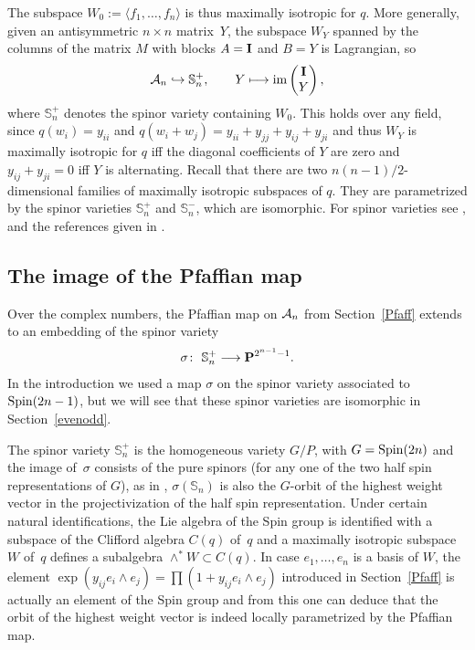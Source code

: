 \documentclass[pdftex]{sigma}
\newcommand{\PP}{{\bf P}}
\newcommand{\bS}{{\mathbb S}}
\newcommand{\cA}{{\cal A}}
\numberwithin{equation}{section}
\begin{document}
The subspace $W_0:=\langle f_1,\ldots,f_n\rangle$ is thus maximally isotropic for $q$. More generally, given an antisymmetric $n\times n$ matrix~$Y$, the subspace $W_Y$ spanned by the columns of the matrix $M$ with blocks $A={\bf I}$ and $B=Y$ is Lagrangian, so
\begin{gather*}
\cA_n \hookrightarrow \bS_n^+,\qquad Y \longmapsto \operatorname{im} \begin{pmatrix} {\bf I}\\Y\end{pmatrix},
\end{gather*}
where $\bS_n^+$ denotes the spinor variety containing $W_0$. This holds over any field, since $q(w_i)=y_{ii}$ and $q(w_i+w_j)=y_{ii}+y_{jj}+y_{ij}+y_{ji}$ and thus $W_Y$ is maximally isotropic for $q$ iff the diagonal coefficients of $Y$ are zero and $y_{ij}+y_{ji}=0$ iff $Y$ is alternating. Recall that there are two $n(n-1)/2$-dimensional families of maximally isotropic subspaces of $q$. They are parametrized by the spinor varieties $\bS_{n}^+$ and $\bS_{n}^-$, which are isomorphic. For spinor varieties see \cite{C}, \cite[Section~11.7]{P} and the references given in \cite[Section~6.0]{RS}.

\subsection{The image of the Pfaffian map}\label{impfaff}
Over the complex numbers, the Pfaffian map on $\cA_n$ from Section~\ref{Pfaff} extends to an embedding of the spinor variety
\begin{gather*}
\sigma\colon \ \bS_n^+ \longrightarrow \PP^{2^{n-1}-1}.
\end{gather*}
In the introduction we used a map $\sigma$ on the spinor variety associated to ${\rm Spin}(2n-1)$, but we will see that these spinor varieties are isomorphic in Section~\ref{evenodd}.

The spinor variety $\bS_{n}^+$ is the homogeneous variety $G/P$, with $G={\rm Spin}(2n)$ and the image of~$\sigma$ consists of the pure spinors (for any one of the two half spin representations of $G$), as in \cite[Section~11.7.2]{P}, $\sigma(\bS_n)$ is also the $G$-orbit of the highest weight vector in the projectivization of the half spin representation. Under certain natural identifications, the Lie algebra of the Spin group is identified with a subspace of the Clifford algebra $C(q)$ of~$q$ and a maximally isotropic subspace~$W$ of~$q$ defines a subalgebra $\wedge^*W\subset C(q)$. In case $e_1,\ldots,e_n$ is a basis of $W$, the element $\exp(y_{ij}e_i\wedge e_j)=\prod(1+y_{ij}e_i\wedge e_j)$ introduced in Section~\ref{Pfaff} is actually an element of the Spin group and from this one can deduce that the orbit of the highest weight vector is indeed locally parametrized by the Pfaffian map.
\end{document}

